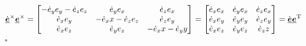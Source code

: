 \begin{equation}
	\dot{\underline{\bm{e}}}^\times \underline{\bm{e}}^\times = 
	\begin{bmatrix}
		-\dot{e}_y e_y - \dot{e}_z e_z & \dot{e}_y e_x & \dot{e}_z e_x \\
		\dot{e}_x e_y & - \dot{e}_x x - \dot{e}_z e_z & \dot{e}_z e_y \\
		\dot{e}_x e_z & \dot{e}_y e_z & - \dot{e}_x x - \dot{e}_y y
	\end{bmatrix}
	=
	\begin{bmatrix}
		\dot{e}_x e_x & \dot{e}_y e_x & \dot{e}_z e_x \\
		\dot{e}_x e_y & \dot{e}_y e_y & \dot{e}_z e_y \\
		\dot{e}_x e_z & \dot{e}_y e_z & \dot{e}_z z
	\end{bmatrix}
	=\dot{\underline{\bm{e}}} \underline{\bm{e}}^{\text{T}}
\end{equation}
\hfill $\square$































